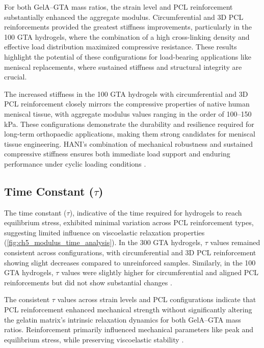 For both GelA--GTA mass ratios, the strain level and PCL reinforcement substantially enhanced the aggregate modulus. Circumferential and 3D PCL reinforcements provided the greatest stiffness improvements, particularly in the 100 GTA hydrogels, where the combination of a high cross-linking density and effective load distribution maximized compressive resistance. These results highlight the potential of these configurations for load-bearing applications like meniscal replacements, where sustained stiffness and structural integrity are crucial.

The increased stiffness in the 100 GTA hydrogels with circumferential and 3D PCL reinforcement closely mirrors the compressive properties of native human meniscal tissue, with aggregate modulus values ranging in the order of 100--150 kPa. These configurations demonstrate the durability and resilience required for long-term orthopaedic applications, making them strong candidates for meniscal tissue engineering. HANI's combination of mechanical robustness and sustained compressive stiffness ensures both immediate load support and enduring performance under cyclic loading conditions \cite{athanasiou2009engineeringknee,boschetti2004biomechanicalproperties,patel2019systematicreview,morejon2020compressiveproperties,morejon2022mechanismsenergy,bahcecioglu20193dprinted}.

\subsection{Time Constant ($\tau$)}

The time constant ($\tau$), indicative of the time required for hydrogels to reach equilibrium stress, exhibited minimal variation across PCL reinforcement types, suggesting limited influence on viscoelastic relaxation properties (\autoref{fig:ch5_modulus_time_analysis}). In the 300 GTA hydrogels, $\tau$ values remained consistent across configurations, with circumferential and 3D PCL reinforcement showing slight decreases compared to unreinforced samples. Similarly, in the 100 GTA hydrogels, $\tau$ values were slightly higher for circumferential and aligned PCL reinforcements but did not show substantial changes \cite{norberg2021viscoelasticequilibrium,disilvestro2001crossvalidationbiphasic}.

The consistent $\tau$ values across strain levels and PCL configurations indicate that PCL reinforcement enhanced mechanical strength without significantly altering the gelatin matrix's intrinsic relaxation dynamics for both GelA--GTA mass ratios. Reinforcement primarily influenced mechanical parameters like peak and equilibrium stress, while preserving viscoelastic stability \cite{norberg2021viscoelasticequilibrium,morejon2020compressiveproperties,patel2019systematicreview}.

